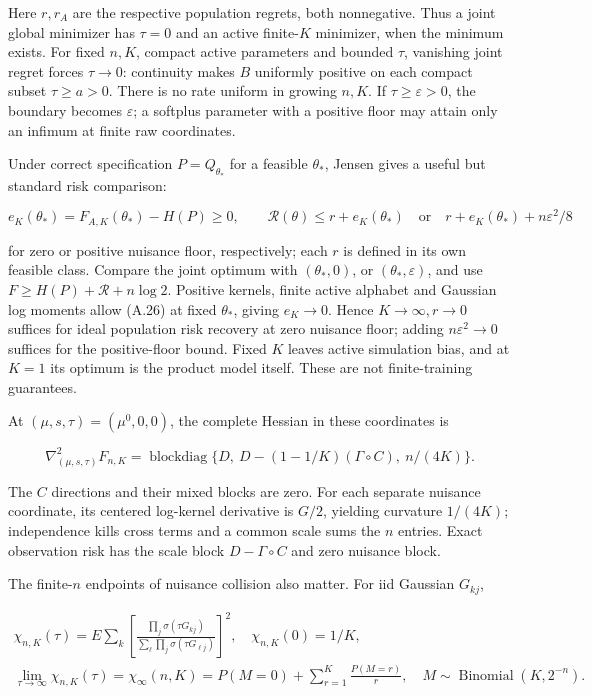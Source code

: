 \documentclass{article}
\begin{document}
Here \(r,r_A\) are the respective population regrets, both nonnegative.
Thus a joint global minimizer has \(\tau=0\) and an active finite-\(K\)
minimizer, when the minimum exists. For fixed \(n,K\), compact active
parameters and bounded \(\tau\), vanishing joint regret forces
\(\tau\to0\): continuity makes \(B\) uniformly positive on each compact
subset \(\tau\ge a>0\). There is no rate uniform in growing \(n,K\). If
\(\tau\ge\varepsilon>0\), the boundary becomes \(\varepsilon\); a
softplus parameter with a positive floor may attain only an infimum at
finite raw coordinates.

Under correct specification \(P=Q_{\theta_*}\) for a feasible
\(\theta_*\), Jensen gives a useful but standard risk comparison:

\[
e_K(\theta_*)=F_{A,K}(\theta_*)-H(P)\ge0,\qquad
\mathcal R(\theta)\le r+e_K(\theta_*)
\quad\text{or}\quad r+e_K(\theta_*)+n\varepsilon^2/8
\tag{A.47}
\]

for zero or positive nuisance floor, respectively; each \(r\) is defined
in its own feasible class. Compare the joint optimum with
\((\theta_*,0)\), or \((\theta_*,\varepsilon)\), and use
\(F\ge H(P)+\mathcal R+n\log2\). Positive kernels, finite active
alphabet and Gaussian log moments allow (A.26) at fixed \(\theta_*\),
giving \(e_K\to0\). Hence \(K\to\infty,r\to0\) suffices for ideal
population risk recovery at zero nuisance floor; adding
\(n\varepsilon^2\to0\) suffices for the positive-floor bound. Fixed
\(K\) leaves active simulation bias, and at \(K=1\) its optimum is the
product model itself. These are not finite-training guarantees.

At \((\mu,s,\tau)=(\mu^0,0,0)\), the complete Hessian in these
coordinates is

\[
\nabla^2_{(\mu,s,\tau)}F_{n,K}
=\operatorname{blockdiag}\{D,\ D-(1-1/K)(\Gamma\circ C),\ n/(4K)\}.
\tag{A.48}
\]

The \(C\) directions and their mixed blocks are zero. For each separate
nuisance coordinate, its centered log-kernel derivative is \(G/2\),
yielding curvature \(1/(4K)\); independence kills cross terms and a
common scale sums the \(n\) entries. Exact observation risk has the
scale block \(D-\Gamma\circ C\) and zero nuisance block.

The finite-\(n\) endpoints of nuisance collision also matter. For iid
Gaussian \(G_{kj}\),

\[
\begin{gathered}
\chi_{n,K}(\tau)=E\sum_k\left[
\frac{\prod_j\sigma(\tau G_{kj})}{\sum_\ell\prod_j\sigma(\tau G_{\ell j})}\right]^2,
\quad \chi_{n,K}(0)=1/K,\\
\lim_{\tau\to\infty}\chi_{n,K}(\tau)
=\chi_\infty(n,K)=P(M=0)+\sum_{r=1}^K\frac{P(M=r)}r,
\quad M\sim\operatorname{Binomial}(K,2^{-n}).
\end{gathered}
\tag{A.49}
\]
\end{document}
